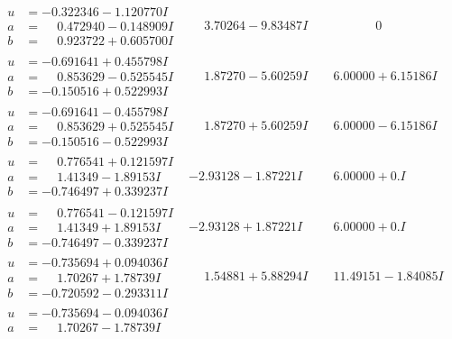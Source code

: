 \documentclass[1p]{elsarticle_modified}
\theoremstyle{definition}
\begin{document}
$$\begin{array}{c|c|c}
\begin{aligned}
u &= -0.322346 - 1.120770 I \\
a &= \phantom{-}0.472940 - 0.148909 I \\
b &= \phantom{-}0.923722 + 0.605700 I\end{aligned}
 & \phantom{-}3.70264 - 9.83487 I & \phantom{-0.000000 } 0 \\ \hline\begin{aligned}
u &= -0.691641 + 0.455798 I \\
a &= \phantom{-}0.853629 - 0.525545 I \\
b &= -0.150516 + 0.522993 I\end{aligned}
 & \phantom{-}1.87270 - 5.60259 I & \phantom{-}6.00000 + 6.15186 I \\ \hline\begin{aligned}
u &= -0.691641 - 0.455798 I \\
a &= \phantom{-}0.853629 + 0.525545 I \\
b &= -0.150516 - 0.522993 I\end{aligned}
 & \phantom{-}1.87270 + 5.60259 I & \phantom{-}6.00000 - 6.15186 I \\ \hline\begin{aligned}
u &= \phantom{-}0.776541 + 0.121597 I \\
a &= \phantom{-}1.41349 - 1.89153 I \\
b &= -0.746497 + 0.339237 I\end{aligned}
 & -2.93128 - 1.87221 I & \phantom{-}6.00000 + 0. I\phantom{ +0.000000I} \\ \hline\begin{aligned}
u &= \phantom{-}0.776541 - 0.121597 I \\
a &= \phantom{-}1.41349 + 1.89153 I \\
b &= -0.746497 - 0.339237 I\end{aligned}
 & -2.93128 + 1.87221 I & \phantom{-}6.00000 + 0. I\phantom{ +0.000000I} \\ \hline\begin{aligned}
u &= -0.735694 + 0.094036 I \\
a &= \phantom{-}1.70267 + 1.78739 I \\
b &= -0.720592 - 0.293311 I\end{aligned}
 & \phantom{-}1.54881 + 5.88294 I & \phantom{-}11.49151 - 1.84085 I \\ \hline\begin{aligned}
u &= -0.735694 - 0.094036 I \\
a &= \phantom{-}1.70267 - 1.78739 I \\

\end{aligned}
\end{array}$$
\end{document}
